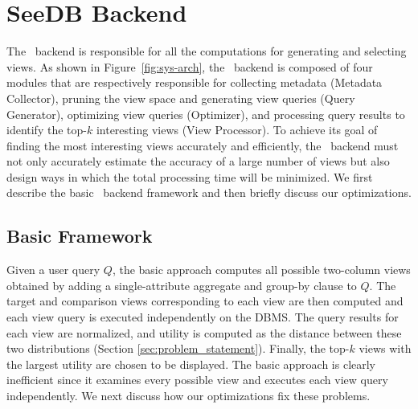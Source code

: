 \section{SeeDB Backend}
\label{subsec:seedb_backend}

The \SeeDB\ backend is responsible for all the computations for 
generating and selecting views. 
 As shown in Figure~\ref{fig:sys-arch}, the \SeeDB\ backend is composed of four
 modules that are respectively responsible for collecting metadata (Metadata Collector), pruning
 the view space and generating view queries (Query Generator), optimizing view
 queries (Optimizer), and processing query results to identify the top-$k$
 interesting views (View Processor). 
To achieve its goal of finding the most
interesting views accurately and efficiently, the \SeeDB\ backend must not only accurately
estimate the accuracy of a large number of views but also design ways in which
the total processing time will be minimized.
We first describe the basic \SeeDB\ backend framework and then briefly discuss our optimizations.


\subsection{Basic Framework}
\label{subsubsec:basic_framework}

Given a user query $Q$, the basic approach computes all
possible two-column views obtained by adding a single-attribute aggregate and group-by clause to $Q$. 
The target and comparison views corresponding to each view are then
computed and each view query is executed independently on the DBMS. The query
results for each view are normalized, and utility is computed as the
distance between these two distributions (Section \ref{sec:problem_statement}).
Finally, the top-$k$ views with the largest utility are chosen to be displayed. 
The basic approach is clearly inefficient
since it examines every possible view 
and executes each view query independently.
We next discuss how our optimizations fix these problems.

